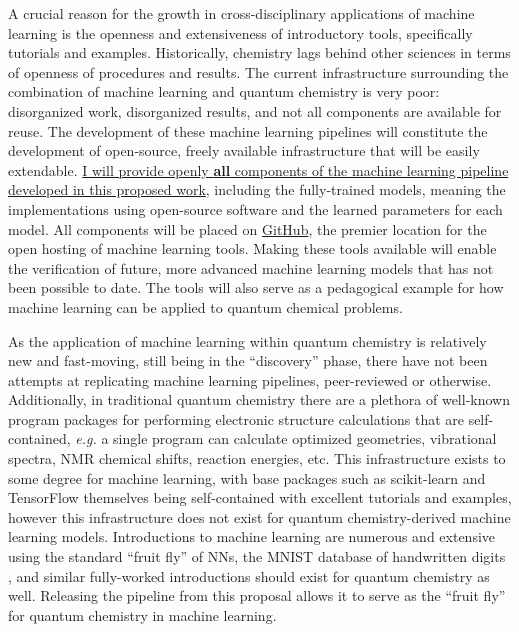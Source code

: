 \documentclass[12pt]{article}
\begin{document}
A crucial reason for the growth in cross-disciplinary applications of machine learning is the openness and extensiveness of introductory tools, specifically tutorials and examples. Historically, chemistry lags behind other sciences in terms of openness of procedures and results. The current infrastructure surrounding the combination of machine learning and quantum chemistry is very poor: disorganized work, disorganized results, and not all components are available for reuse. The development of these machine learning pipelines will constitute the development of open-source, freely available infrastructure that will be easily extendable. \uline{I will provide openly \textbf{all} components of the machine learning pipeline developed in this proposed work}, including the fully-trained models, meaning the implementations using open-source software and the learned parameters for each model. All components will be placed on \href{https://github.com/}{GitHub}, the premier location for the open hosting of machine learning tools. Making these tools available will enable the verification of future, more advanced machine learning models that has not been possible to date. The tools will also serve as a pedagogical example for how machine learning can be applied to quantum chemical problems.

As the application of machine learning within quantum chemistry is relatively new and fast-moving, still being in the ``discovery'' phase, there have not been attempts at replicating machine learning pipelines, peer-reviewed or otherwise. Additionally, in traditional quantum chemistry there are a plethora of well-known program packages for performing electronic structure calculations \cite{QCHEM4,daltonpaper,WCMS:WCMS93} that are self-contained, \emph{e.g.} a single program can calculate optimized geometries, vibrational spectra, NMR chemical shifts, reaction energies, etc. This infrastructure exists to some degree for machine learning, with base packages such as scikit-learn \cite{scikit-learn} and TensorFlow \cite{tensorflow2015-whitepaper} themselves being self-contained with excellent tutorials and examples, however this infrastructure does not exist for quantum chemistry-derived machine learning models. Introductions to machine learning are numerous and extensive using the standard ``fruit fly'' of NNs, the MNIST database of handwritten digits \cite{lecun-01a}, and similar fully-worked introductions should exist for quantum chemistry as well. Releasing the pipeline from this proposal allows it to serve as the ``fruit fly'' for quantum chemistry in machine learning.

\printbibliography
\listoffixmes
\end{document}
